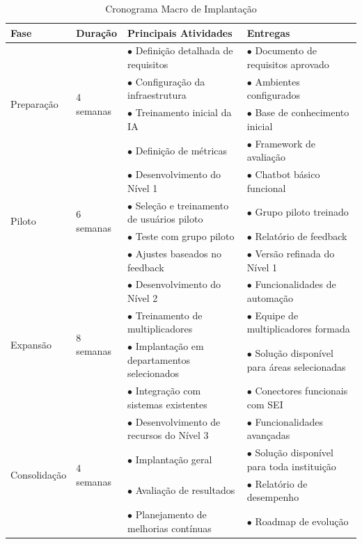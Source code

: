 \documentclass[12pt,a4paper]{article}
\begin{document}
\begin{table}[h]
\centering
\begin{tcolorbox}[enhanced, colback=white, colframe=gray!40, arc=3mm, boxrule=0.5pt]
\scriptsize
\begin{tabular}{|p{1.8cm}|p{1cm}|p{4.8cm}|p{4cm}|}
\hline
\rowcolor{gray!20}
\textbf{Fase} & \textbf{Duração} & \textbf{Principais Atividades} & \textbf{Entregas} \\
\hline
\multirow{4}{*}{Preparação} & \multirow{4}{*}{4 semanas} & $\bullet$ Definição detalhada de requisitos & $\bullet$ Documento de requisitos aprovado \\
\cline{3-4}
 & & $\bullet$ Configuração da infraestrutura & $\bullet$ Ambientes configurados \\
\cline{3-4}
 & & $\bullet$ Treinamento inicial da IA & $\bullet$ Base de conhecimento inicial \\
\cline{3-4}
 & & $\bullet$ Definição de métricas & $\bullet$ Framework de avaliação \\
\hline
\multirow{4}{*}{Piloto} & \multirow{4}{*}{6 semanas} & $\bullet$ Desenvolvimento do Nível 1 & $\bullet$ Chatbot básico funcional \\
\cline{3-4}
 & & $\bullet$ Seleção e treinamento de usuários piloto & $\bullet$ Grupo piloto treinado \\
\cline{3-4}
 & & $\bullet$ Teste com grupo piloto & $\bullet$ Relatório de feedback \\
\cline{3-4}
 & & $\bullet$ Ajustes baseados no feedback & $\bullet$ Versão refinada do Nível 1 \\
\hline
\multirow{4}{*}{Expansão} & \multirow{4}{*}{8 semanas} & $\bullet$ Desenvolvimento do Nível 2 & $\bullet$ Funcionalidades de automação \\
\cline{3-4}
 & & $\bullet$ Treinamento de multiplicadores & $\bullet$ Equipe de multiplicadores formada \\
\cline{3-4}
 & & $\bullet$ Implantação em departamentos selecionados & $\bullet$ Solução disponível para áreas selecionadas \\
\cline{3-4}
 & & $\bullet$ Integração com sistemas existentes & $\bullet$ Conectores funcionais com SEI \\
\hline
\multirow{4}{*}{Consolidação} & \multirow{4}{*}{4 semanas} & $\bullet$ Desenvolvimento de recursos do Nível 3 & $\bullet$ Funcionalidades avançadas \\
\cline{3-4}
 & & $\bullet$ Implantação geral & $\bullet$ Solução disponível para toda instituição \\
\cline{3-4}
 & & $\bullet$ Avaliação de resultados & $\bullet$ Relatório de desempenho \\
\cline{3-4}
 & & $\bullet$ Planejamento de melhorias contínuas & $\bullet$ Roadmap de evolução \\
\hline
\end{tabular}
\end{tcolorbox}
\caption{Cronograma Macro de Implantação}
\end{table}
\end{document}
